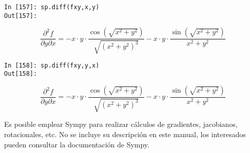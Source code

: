 \begin{center}
\begin{minipage}{.6\textwidth}
\begin{verbatim}
In [157]: sp.diff(fxy,x,y)
Out[157]:
\end{verbatim}
\begin{equation*} 
	\frac{\partial^2f}{\partial y\partial x} =-x\cdot y\cdot\frac{\cos(\sqrt{x^2+y^2})}{\sqrt{(x^2+y^2)^3}} - 
	x\cdot y \cdot\frac{\sin(\sqrt{x^2+y^2})}{x^2+y^2} 
\end{equation*}
		\begin{verbatim}
In [158]: sp.diff(fxy,y,x)
Out[158]: 
\end{verbatim}
\begin{equation*} 
	\frac{\partial^2f}{\partial y\partial x} =-x\cdot y\cdot\frac{\cos(\sqrt{x^2+y^2})}{\sqrt{(x^2+y^2)^3}} - 
	x\cdot y \cdot\frac{\sin(\sqrt{x^2+y^2})}{x^2+y^2} 
\end{equation*}

	\end{minipage}
\end{center}
\begin{paracol}{2}
Es posible emplear Sympy para realizar cálculos de gradientes, jacobianos, rotacionales, etc. No se incluye su descripción en este manual, los interesados pueden consultar la documentación de Sympy.
\end{paracol}

